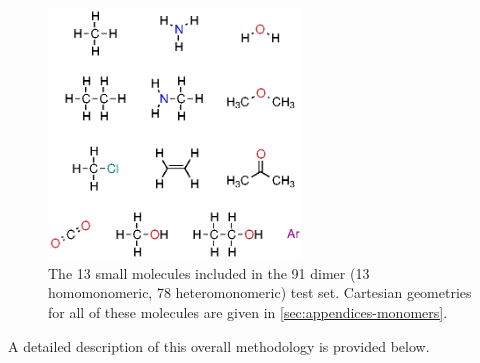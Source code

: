     \begin{figure}
      \includegraphics[width=0.6\textwidth]{isotropic/91_dimer_test_set.eps}
      \caption{
        The 13 small molecules included in the 91 dimer (13 homomonomeric, 78
        heteromonomeric) test set. Cartesian geometries for all of these
        molecules are given in \cref{sec:appendices-monomers}.
              }
      \label{fig:isotropic-molecules}
    \end{figure}

A detailed description of this overall methodology is provided below.

